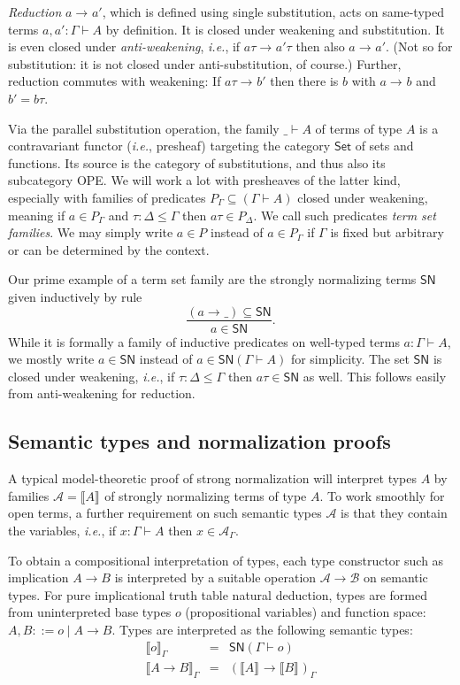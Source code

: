 \documentclass[a4paper,USenglish,cleveref, autoref, thm-restate]{lipics-v2019}
\newcommand{\ie}{\emph{i.e.}\xspace}
\newcommand{\den}[2][]{\llbracket#2\rrbracket^{#1}}
\newcommand{\ru}{\dfrac}
\newcommand{\Den}[2]{\den{#1}_{#2}}
\newcommand{\Set}{\mathsf{Set}}
\newcommand{\red}[1][]{\longrightarrow_{#1}}
\newcommand{\A}{\mathcal{A}}
\newcommand{\B}{\mathcal{B}}
\newcommand{\SN}{\mathsf{SN}}
\begin{document}
\emph{Reduction} $a \red a'$, which is defined using single substitution,
acts on same-typed terms
$a,a' : \Gamma \vdash A$ by definition.  It is closed under weakening
and substitution.  It is even closed under \emph{anti-weakening}, \ie,
if $a\tau \red a'\tau$ then also $a \red a'$.  (Not so for
substitution: it is not closed under anti-substitution, of course.)
Further, reduction commutes with weakening:  If $a\tau \red b'$ then there is
$b$ with $a \red b$ and $b' = b\tau$.

Via the parallel substitution operation, the family $\_ \vdash A$ of
terms of type $A$ is a contravariant functor (\ie, presheaf) targeting the
category $\Set$ of sets and functions.
Its source is the category of
substitutions, and thus also its subcategory OPE.  We will work a
lot with presheaves of the latter kind, especially with families of
predicates $P_\Gamma \subseteq (\Gamma \vdash A)$ closed under
weakening, meaning if $a \in P_\Gamma$ and $\tau : \Delta \leq \Gamma$
then $a \tau \in P_\Delta$.  We call such predicates \emph{term set
  families}.
We may simply write $a \in P$ instead of $a \in P_\Gamma$ if $\Gamma$
is fixed but arbitrary or can be determined by the context.

Our prime example of a term set family are the strongly normalizing
terms $\SN$ given inductively by rule
\[
  \ru{(a \red \_) \subseteq \SN
    }{a \in \SN}
  .
\]
While it is formally a family of inductive predicates on well-typed terms
$a : \Gamma \vdash A$, we mostly write $a \in \SN$ instead of
$a \in \SN(\Gamma \vdash A)$ for simplicity.  The set $\SN$ is closed
under weakening, \ie, if $\tau : \Delta \leq \Gamma$ then
$a\tau \in \SN$ as well.  This follows easily from anti-weakening for
reduction.

\subsection{Semantic types and normalization proofs}

A typical model-theoretic proof of strong normalization will interpret
types $A$ by families $\A = \den A$ of strongly normalizing terms of type $A$.
To work smoothly for open terms, a further requirement on such
semantic types $\A$ is that they contain the variables, \ie,
if $x : \Gamma \vdash A$ then $x \in \A_\Gamma$.

To obtain a compositional interpretation of types, each type
constructor such as implication $A \to B$ is interpreted by a suitable
operation $\A \to \B$ on semantic types.
For pure implicational truth table natural deduction, types are formed
from uninterpreted base types $o$ (propositional variables) and
function space: $A,B ::= o \mid A \to B$.  Types are interpreted as
the following semantic types:
\[
\begin{array}{lll}
  \Den o \Gamma & = & \SN(\Gamma \vdash o) \\
  \Den{A \to B} \Gamma & = & (\den A \to \den B)_\Gamma \\
\end{array}
\]
\end{document}
